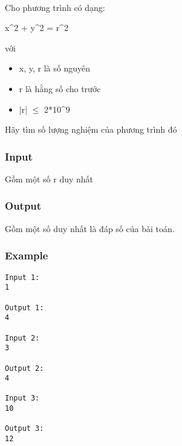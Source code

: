 

 

Cho phương trình có dạng:

x^2 + y^2 = r^2

với
\begin{itemize}
	\item x, y, r là số nguyên
	\item r là hằng số cho trước
	\item |r|  $\le$  2*10^9
\end{itemize}

Hãy tìm số lượng nghiệm của phương trình đó

\subsubsection{Input}

Gồm một số r duy nhất

\subsubsection{Output}

Gồm một số duy nhất là đáp số của bài toán.

\subsubsection{Example}
\begin{verbatim}
Input 1:
1

Output 1:
4

Input 2:
3

Output 2:
4

Input 3:
10

Output 3:
12
\end{verbatim}
